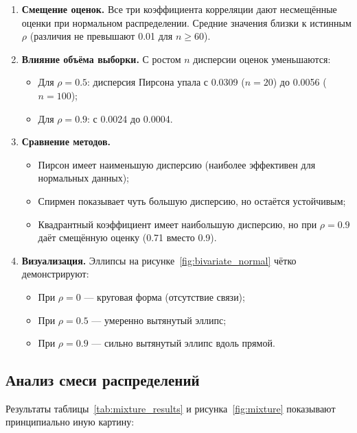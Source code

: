 \documentclass[12pt, a4paper]{article}
\begin{document}
\begin{enumerate}
    \item \textbf{Смещение оценок.} Все три коэффициента корреляции дают несмещённые оценки при нормальном распределении. Средние значения близки к истинным $\rho$ (различия не превышают 0.01 для $n \geq 60$).
    
    \item \textbf{Влияние объёма выборки.} С ростом $n$ дисперсии оценок уменьшаются:
    \begin{itemize}
        \item Для $\rho = 0.5$: дисперсия Пирсона упала с 0.0309 ($n=20$) до 0.0056 ($n=100$);
        \item Для $\rho = 0.9$: с 0.0024 до 0.0004.
    \end{itemize}
    
    \item \textbf{Сравнение методов.} 
    \begin{itemize}
        \item Пирсон имеет наименьшую дисперсию (наиболее эффективен для нормальных данных);
        \item Спирмен показывает чуть большую дисперсию, но остаётся устойчивым;
        \item Квадрантный коэффициент имеет наибольшую дисперсию, но при $\rho = 0.9$ даёт смещённую оценку (0.71 вместо 0.9).
    \end{itemize}
    
    \item \textbf{Визуализация.} Эллипсы на рисунке~\ref{fig:bivariate_normal} чётко демонстрируют:
    \begin{itemize}
        \item При $\rho = 0$ — круговая форма (отсутствие связи);
        \item При $\rho = 0.5$ — умеренно вытянутый эллипс;
        \item При $\rho = 0.9$ — сильно вытянутый эллипс вдоль прямой.
    \end{itemize}
\end{enumerate}

\subsection{Анализ смеси распределений}

Результаты таблицы~\ref{tab:mixture_results} и рисунка~\ref{fig:mixture} показывают принципиально иную картину:
\end{document}
